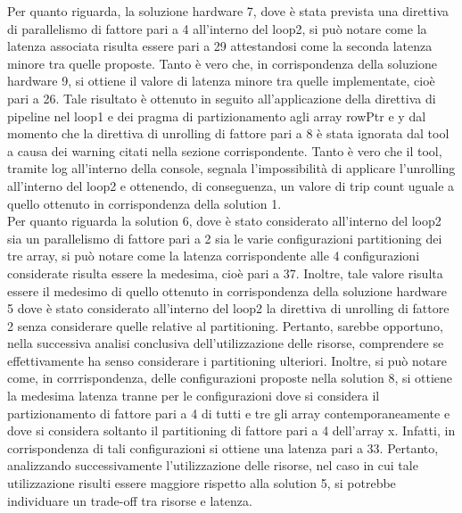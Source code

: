 Per quanto riguarda, la soluzione hardware 7, dove è stata prevista una direttiva di parallelismo di fattore pari a 4 all'interno del loop2, si può notare come la latenza associata risulta essere pari a 29 attestandosi come la seconda latenza minore tra quelle proposte. Tanto è vero che, in corrispondenza della soluzione hardware 9, si ottiene il valore di latenza minore tra quelle implementate, cioè pari a 26. Tale risultato è ottenuto in seguito all'applicazione della direttiva di pipeline nel loop1 e dei pragma di partizionamento agli array rowPtr e y dal momento che la direttiva di unrolling di fattore pari a 8 è stata ignorata dal tool a causa dei warning citati nella sezione corrispondente. Tanto è vero che il tool, tramite log all'interno della console, segnala l'impossibilità di applicare l'unrolling all'interno del loop2 e ottenendo, di conseguenza, un valore di trip count uguale a quello ottenuto in corrispondenza della solution 1. 
\\
Per quanto riguarda la solution 6, dove è stato considerato all'interno del loop2 sia un parallelismo di fattore pari a 2 sia le varie configurazioni partitioning dei tre array, si può notare come la latenza corrispondente alle 4 configurazioni considerate risulta essere la medesima, cioè pari a 37. Inoltre, tale valore risulta essere il medesimo di quello ottenuto in corrispondenza della soluzione hardware 5 dove è stato considerato all'interno del loop2 la direttiva di unrolling di fattore 2 senza considerare quelle relative al partitioning. Pertanto, sarebbe opportuno, nella successiva analisi conclusiva dell'utilizzazione delle risorse, comprendere se effettivamente ha senso considerare i partitioning ulteriori. Inoltre, si può notare come, in corrrispondenza, delle configurazioni proposte nella solution 8, si ottiene la medesima latenza tranne per le configurazioni dove si considera il partizionamento di fattore pari a 4 di tutti e tre gli array contemporaneamente e dove si considera soltanto il partitioning di fattore pari a 4 dell'array x. Infatti, in corrispondenza di tali configurazioni si ottiene una latenza pari a 33. Pertanto, analizzando successivamente l'utilizzazione delle risorse, nel caso in cui tale utilizzazione risulti essere maggiore rispetto alla solution 5, si potrebbe individuare un trade-off tra risorse e latenza.

